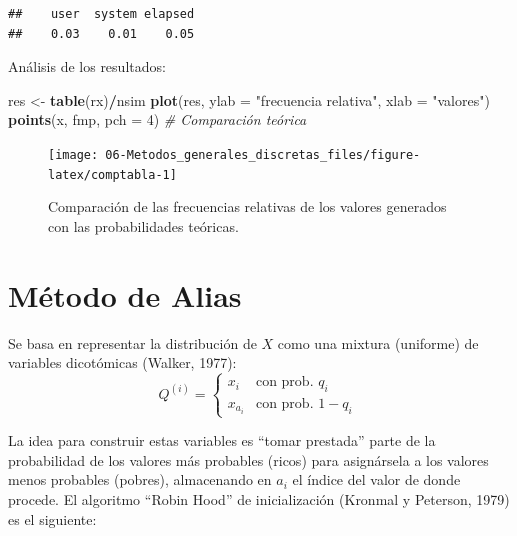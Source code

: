 \documentclass[
]{book}
\newenvironment{Shaded}{\begin{snugshade}}{\end{snugshade}}
\newcommand{\CommentTok}[1]{\textcolor[rgb]{0.56,0.35,0.01}{\textit{#1}}}
\newcommand{\DataTypeTok}[1]{\textcolor[rgb]{0.13,0.29,0.53}{#1}}
\newcommand{\DecValTok}[1]{\textcolor[rgb]{0.00,0.00,0.81}{#1}}
\newcommand{\KeywordTok}[1]{\textcolor[rgb]{0.13,0.29,0.53}{\textbf{#1}}}
\newcommand{\NormalTok}[1]{#1}
\newcommand{\OperatorTok}[1]{\textcolor[rgb]{0.81,0.36,0.00}{\textbf{#1}}}
\newcommand{\StringTok}[1]{\textcolor[rgb]{0.31,0.60,0.02}{#1}}
\theoremstyle{break}
\theoremstyle{definition}
\theoremstyle{definition}
\theoremstyle{definition}
\theoremstyle{remark}
\begin{document}
\begin{verbatim}
##    user  system elapsed 
##    0.03    0.01    0.05
\end{verbatim}

Análisis de los resultados:

\begin{Shaded}
\begin{Highlighting}[]
\NormalTok{res <-}\StringTok{ }\KeywordTok{table}\NormalTok{(rx)}\OperatorTok{/}\NormalTok{nsim}
\KeywordTok{plot}\NormalTok{(res, }\DataTypeTok{ylab =} \StringTok{"frecuencia relativa"}\NormalTok{, }\DataTypeTok{xlab =} \StringTok{"valores"}\NormalTok{)}
\KeywordTok{points}\NormalTok{(x, fmp, }\DataTypeTok{pch =} \DecValTok{4}\NormalTok{)  }\CommentTok{# Comparación teórica}
\end{Highlighting}
\end{Shaded}

\begin{figure}[!htb]

{\centering \texttt{[image: 06-Metodos\_generales\_discretas\_files/figure-latex/comptabla-1]} 

}

\caption{Comparación de las frecuencias relativas de los valores generados con las probabilidades teóricas.}\label{fig:comptabla}
\end{figure}

\hypertarget{alias}{%
\section{Método de Alias}\label{alias}}

Se basa en representar la distribución de \(X\) como una mixtura
(uniforme) de variables dicotómicas (Walker, 1977):
\[Q^{(i)}=\left\{ 
\begin{array}{ll}
x_{i} & \text{con prob. } q_{i} \\ 
x_{a_{i}} & \text{con prob. } 1-q_{i}
\end{array}
\ \right.\]

La idea para construir estas variables es ``tomar prestada'' parte de la probabilidad de los valores más probables (ricos) para asignársela a los valores menos probables (pobres), almacenando en \(a_i\) el índice del valor de donde procede.
El algoritmo ``Robin Hood'' de inicialización (Kronmal y Peterson, 1979) es el siguiente:
\end{document}
